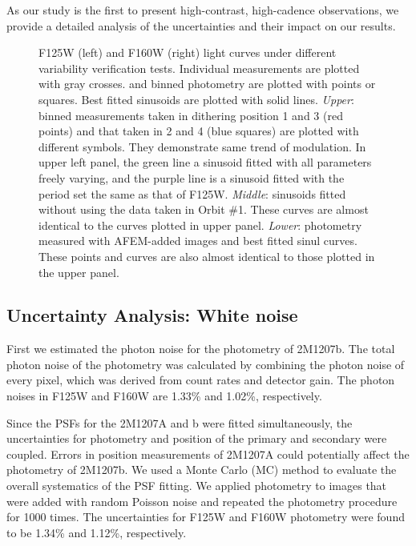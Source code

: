 \documentclass[apj]{emulateapj}
\begin{document}
As our study is the first to present high-contrast, high-cadence
observations, we provide a detailed analysis of the uncertainties and
their impact on our results.

\begin{figure}
  \centering
  \caption{F125W (left) and F160W (right) light curves under different
    variability verification tests. Individual measurements are
    plotted with gray crosses.  and binned photometry are plotted with points
    or squares. Best fitted sinusoids are plotted with solid
    lines. {\em Upper}: binned measurements taken in dithering
    position 1 and 3 (red points) and that taken in 2 and 4 (blue
    squares) are plotted with different symbols. They demonstrate same
    trend of modulation. In upper left panel, the green line a sinusoid
    fitted with all parameters freely varying, and the purple line is
    a sinusoid fitted with the period set the same as that of
    F125W. {\em Middle}: sinusoids fitted without using the
    data taken in Orbit \#1. These curves are almost identical to the
    curves plotted in upper panel. {\em Lower}: photometry measured
    with AFEM-added images and best fitted sinul curves. These
    points and curves are also almost identical to those plotted
    in the upper panel.}
  \label{fig:2}
\end{figure}

\subsection{Uncertainty Analysis: White noise}

First we estimated the photon noise for the photometry of
2M1207b. The total photon noise of the photometry was calculated by
combining the photon noise of every pixel, which was derived
from count rates and detector gain. The photon noises 
in F125W and F160W are 1.33\% and 1.02\%, respectively.

Since the PSFs for the 2M1207A and b were fitted simultaneously, the
uncertainties for photometry and position of the primary and secondary
were coupled. Errors in position measurements of 2M1207A could
potentially affect the photometry of 2M1207b. We used a Monte Carlo
(MC) method to evaluate the overall systematics of the PSF fitting. We
applied photometry to images that were added with random
Poisson noise and repeated the photometry procedure for 1000 times. The
uncertainties for F125W and F160W photometry were found to be 1.34\% and 1.12\%,
respectively. 
\end{document}
